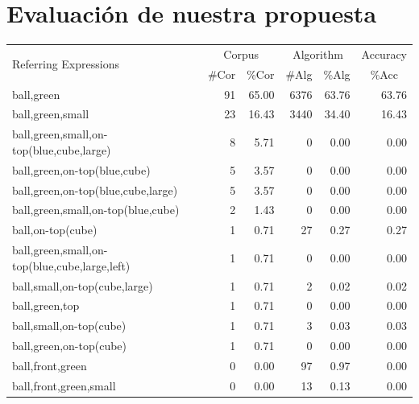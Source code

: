 \chapter{Evaluaci\'on de nuestra propuesta}
\label{sec:evaluacion}


\begin{table}[!t]
\begin{small}
\begin{center}
\begin{tabular}{|l|r|r|r|r|r|}
\hline
\multirow{2}{*}{Referring Expressions} & \multicolumn{2}{|c|}{Corpus} & \multicolumn{2}{|c|}{Algorithm} & Accuracy \\ \cline{2-6} 
 & \#Cor & \multicolumn{1}{|c|}{\%Cor} & \multicolumn{1}{|c|}{\#Alg} & \multicolumn{1}{|c|}{\%Alg} & \multicolumn{1}{|c|}{\%Acc} \\
\hline
ball,green                                    & 91 & 65.00 & 6376 & 63.76 & 63.76 \\
ball,green,small                              & 23 & 16.43 & 3440 & 34.40 & 16.43 \\
ball,green,small,on-top(blue,cube,large)      &  8 &  5.71 &    0 &  0.00 &  0.00\\
ball,green,on-top(blue,cube)                  &  5 &  3.57 &    0 &  0.00 &  0.00\\
ball,green,on-top(blue,cube,large)            &  5 &  3.57 &    0 &  0.00 &  0.00\\
ball,green,small,on-top(blue,cube)            &  2 &  1.43 &    0 &  0.00 &  0.00\\
ball,on-top(cube)                             &  1 &  0.71 &   27 &  0.27 &  0.27 \\
ball,green,small,on-top(blue,cube,large,left) &  1 &  0.71 &    0 &  0.00 &  0.00\\
ball,small,on-top(cube,large)	              &  1 &  0.71 &    2 &  0.02 &  0.02 \\
ball,green,top                                &  1 &  0.71 &    0 &  0.00 &  0.00\\
ball,small,on-top(cube)                       &  1 &  0.71 &    3 &  0.03 &  0.03 \\
ball,green,on-top(cube)                       &  1 &  0.71 &    0 &  0.00 &  0.00\\
ball,front,green                              &  0 &  0.00 &   97 &  0.97 &  0.00\\
ball,front,green,small                        &  0 &  0.00 &   13 &  0.13 &  0.00\\

\end{tabular}
\end{center}
\end{small}
\end{table}
